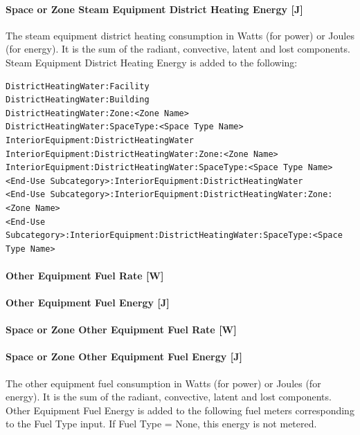 \paragraph{Space or Zone Steam Equipment District Heating Energy {[}J{]}}\label{zone-steam-equipment-district-heating-energy-j}

The steam equipment district heating consumption in Watts (for power) or Joules (for energy). It is the sum of the radiant, convective, latent and lost components. Steam Equipment District Heating Energy is added to the following:

\begin{lstlisting}
DistrictHeatingWater:Facility
DistrictHeatingWater:Building
DistrictHeatingWater:Zone:<Zone Name>
DistrictHeatingWater:SpaceType:<Space Type Name>
InteriorEquipment:DistrictHeatingWater
InteriorEquipment:DistrictHeatingWater:Zone:<Zone Name>
InteriorEquipment:DistrictHeatingWater:SpaceType:<Space Type Name>
<End-Use Subcategory>:InteriorEquipment:DistrictHeatingWater
<End-Use Subcategory>:InteriorEquipment:DistrictHeatingWater:Zone:<Zone Name>
<End-Use Subcategory>:InteriorEquipment:DistrictHeatingWater:SpaceType:<Space Type Name>
\end{lstlisting}

\paragraph{Other Equipment Fuel Rate {[}W{]}}\label{otherequip-fuel-rate}

\paragraph{Other Equipment Fuel Energy {[}J{]}}\label{otherequip-fuel-energy}

\paragraph{Space or Zone Other Equipment Fuel Rate {[}W{]}}\label{zone-otherequip-fuel-rate}

\paragraph{Space or Zone Other Equipment Fuel Energy {[}J{]}}\label{zone-otherequip-fuel-energy}

The other equipment fuel consumption in Watts (for power) or Joules (for energy). It is the sum of the radiant, convective, latent and lost components. Other Equipment Fuel Energy is added to the following fuel meters corresponding to the Fuel Type input. If Fuel Type = None, this energy is not metered.

